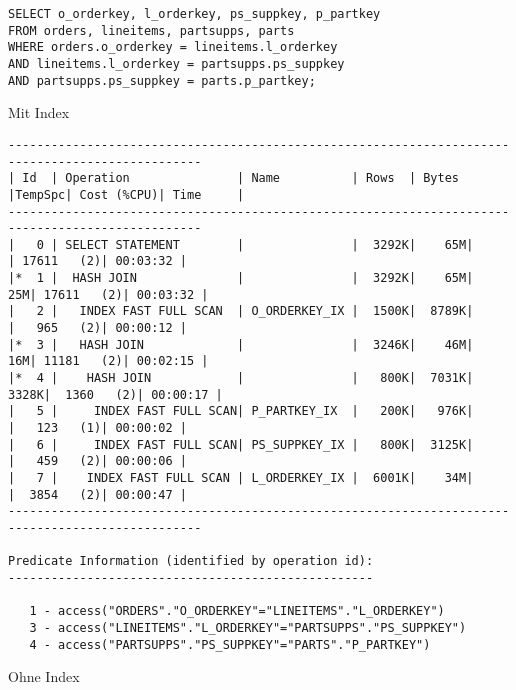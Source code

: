 \documentclass[10pt]{article}
\begin{document}
\begin{lstlisting}[style=sql]
SELECT o_orderkey, l_orderkey, ps_suppkey, p_partkey
FROM orders, lineitems, partsupps, parts
WHERE orders.o_orderkey = lineitems.l_orderkey
AND lineitems.l_orderkey = partsupps.ps_suppkey
AND partsupps.ps_suppkey = parts.p_partkey;
\end{lstlisting}
Mit Index
\begin{lstlisting}[style=queryexecutionplan]
-------------------------------------------------------------------------------------------------
| Id  | Operation               | Name          | Rows  | Bytes |TempSpc| Cost (%CPU)| Time     |
-------------------------------------------------------------------------------------------------
|   0 | SELECT STATEMENT        |               |  3292K|    65M|       | 17611   (2)| 00:03:32 |
|*  1 |  HASH JOIN              |               |  3292K|    65M|    25M| 17611   (2)| 00:03:32 |
|   2 |   INDEX FAST FULL SCAN  | O_ORDERKEY_IX |  1500K|  8789K|       |   965   (2)| 00:00:12 |
|*  3 |   HASH JOIN             |               |  3246K|    46M|    16M| 11181   (2)| 00:02:15 |
|*  4 |    HASH JOIN            |               |   800K|  7031K|  3328K|  1360   (2)| 00:00:17 |
|   5 |     INDEX FAST FULL SCAN| P_PARTKEY_IX  |   200K|   976K|       |   123   (1)| 00:00:02 |
|   6 |     INDEX FAST FULL SCAN| PS_SUPPKEY_IX |   800K|  3125K|       |   459   (2)| 00:00:06 |
|   7 |    INDEX FAST FULL SCAN | L_ORDERKEY_IX |  6001K|    34M|       |  3854   (2)| 00:00:47 |
-------------------------------------------------------------------------------------------------
 
Predicate Information (identified by operation id):
---------------------------------------------------
 
   1 - access("ORDERS"."O_ORDERKEY"="LINEITEMS"."L_ORDERKEY")
   3 - access("LINEITEMS"."L_ORDERKEY"="PARTSUPPS"."PS_SUPPKEY")
   4 - access("PARTSUPPS"."PS_SUPPKEY"="PARTS"."P_PARTKEY")
\end{lstlisting}
Ohne Index
\end{document}
